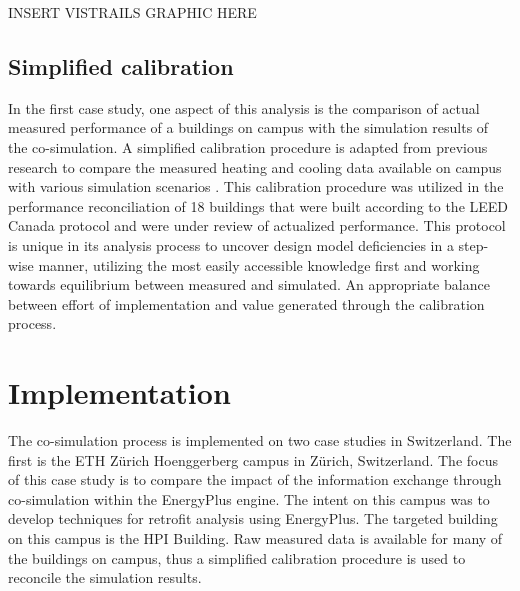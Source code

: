 \documentclass{tBPS2e}
\theoremstyle{plain}
\theoremstyle{definition}
\theoremstyle{remark}
\begin{document}
INSERT VISTRAILS GRAPHIC HERE


\subsection{Simplified calibration}
In the first case study, one aspect of this analysis is the comparison of actual measured performance of a buildings on campus with the simulation results of the co-simulation. A simplified calibration procedure is adapted from previous research to compare the measured heating and cooling data available on campus with various simulation scenarios \citep{Samuelson:2015jg}. This calibration procedure was utilized in the performance reconciliation of 18 buildings that were built according to the LEED Canada protocol and were under review of actualized performance. This protocol is unique in its analysis process to uncover design model deficiencies in a step-wise manner, utilizing the most easily accessible knowledge first and working towards equilibrium between measured and simulated. An appropriate balance between effort of implementation and value generated through the calibration process. 


 
\section{Implementation}\label{Implementation}
The co-simulation process is implemented on two case studies in Switzerland. The first is the ETH Z\"urich Hoenggerberg campus in Z\"urich, Switzerland. The focus of this case study is to compare the impact of the information exchange through co-simulation within the EnergyPlus engine. The intent on this campus was to develop techniques for retrofit analysis using EnergyPlus. The targeted building on this campus is the HPI Building. Raw measured data is available for many of the buildings on campus, thus a simplified calibration procedure is used to reconcile the simulation results.\\
\end{document}
